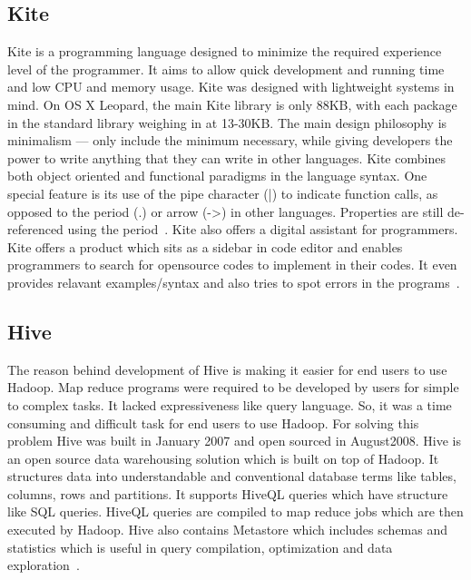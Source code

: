 \subsection{Kite}

Kite is a programming language designed to minimize the required
experience level of the programmer.  It aims to allow quick
development and running time and low CPU and memory usage. Kite was
designed with lightweight systems in mind.  On OS X Leopard, the main
Kite library is only 88KB, with each package in the standard library
weighing in at 13-30KB. The main design philosophy is minimalism —
only include the minimum necessary, while giving developers the power
to write anything that they can write in other languages. Kite
combines both object oriented and functional paradigms in the language
syntax.  One special feature is its use of the pipe character (|) to
indicate function calls, as opposed to the period (.) or arrow (->) in
other languages.  Properties are still de-referenced using the
period~\cite{kite-devtopics}. Kite also offers a digital assistant for
programmers. Kite offers a product which sits as a sidebar in code
editor and enables programmers to search for opensource codes to
implement in their codes. It even provides relavant examples/syntax
and also tries to spot errors in the programs~\cite{kite-wired}.
	   
\subsection{Hive}
     
The reason behind development of Hive is making it easier for end
users to use Hadoop. Map reduce programs were required to be developed
by users for simple to complex tasks. It lacked expressiveness like
query language. So, it was a time consuming and difficult task for end
users to use Hadoop. For solving this problem Hive was built in
January 2007 and open sourced in August2008.  Hive is an open source
data warehousing solution which is built on top of Hadoop. It
structures data into understandable and conventional database terms
like tables, columns, rows and partitions. It supports HiveQL queries
which have structure like SQL queries. HiveQL queries are compiled to
map reduce jobs which are then executed by Hadoop.  Hive also contains
Metastore which includes schemas and statistics which is useful in
query compilation, optimization and data exploration~\cite{www-hive}.

     \pv

